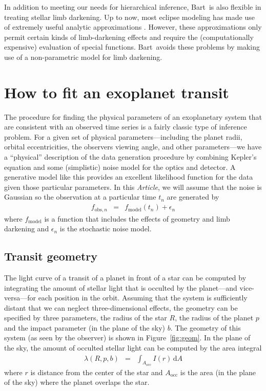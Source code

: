 \documentclass[12pt,preprint]{aastex}
\newcommand{\project}[1]{{\sffamily #1}}
\newcommand{\bart}{\project{Bart}}
\newcommand{\paper}{\emph{Article}}
\newcommand{\Fig}[1]{Figure~\ref{fig:#1}}
\newcommand{\fig}[1]{\Fig{#1}}
\newcommand{\eqlabel}[1]{\label{eq:#1}}
\newcommand{\dd}{\mathrm{d}}
\begin{document}
In addition to meeting our needs for hierarchical inference, \bart\ is
also flexible in treating stellar limb darkening.
Up to now, most eclipse modeling has made use of extremely useful analytic
approximations \citep{mandel}.
However, these approximations only permit certain kinds of limb-darkening
effects and require the (computationally expensive) evaluation of special
functions.
\bart\ avoids these problems by making use of a non-parametric model for limb
darkening.


\section{How to fit an exoplanet transit}

The procedure for finding the physical parameters of an exoplanetary system
that are consistent with an observed time series is a fairly classic type of
inference problem.
For a given set of physical parameters---including the
planet radii, orbital eccentricities, the observers viewing angle, and other
parameters---we have a ``physical'' description of the data generation
procedure by combining Kepler's equation and some (simplistic) noise model for
the optics and detector.
A generative model like this provides an excellent
likelihood function for the data given those particular parameters.
In this \paper, we will assume that the noise is Gaussian so the observation
at a particular time $t_n$ are generated by
\begin{eqnarray}
    f_{\mathrm{obs},n} & = & f_\mathrm{model} (t_n) + \epsilon_n
\end{eqnarray}
where $f_\mathrm{model}$ is a function that includes the effects of geometry
and limb darkening and $\epsilon_n$ is the stochastic noise model.

\subsection{Transit geometry}

The light curve of a transit of a planet in front of a star can be computed by
integrating the amount of stellar light that is occulted by the planet---and
vice-versa---for each position in the orbit.
Assuming that the system is sufficiently distant that we can neglect
three-dimensional effects, the geometry can be specified by three parameters,
the radius of the star $R$, the radius of the planet $p$ and the impact
parameter (in the plane of the sky) $b$.
The geometry of this system (as seen by the observer) is shown in \fig{geom}.
In the plane of the sky, the amount of occulted stellar light can be computed
by the area integral
\begin{eqnarray}\eqlabel{general-occ}
    \lambda (R, p, b) & = & \int_{A_\mathrm{occ}} I(r) \, \dd A
\end{eqnarray}
where $r$ is distance from the center of the star and $A_\mathrm{occ}$ is the
area (in the plane of the sky) where the planet overlaps the star.
\end{document}
